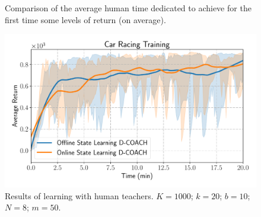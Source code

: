\begin{figure}[H]
\centering
{}
\caption{Comparison of the average human time dedicated to achieve for the first time some levels of return (on average).} 
\label{fig:stacked_bar} 
\end{figure}

\begin{figure}[H]
    \centering
    \includegraphics[width=0.9\linewidth]{imagenes/cap3/car_racing_human_teacher_ICRA.pdf}
    \caption{Results of learning with human teachers. $K = 1000$; $k=20$; $b = 10$; $N = 8$; $m=50$.}
    \label{fig:humanteachers1}
\end{figure}

